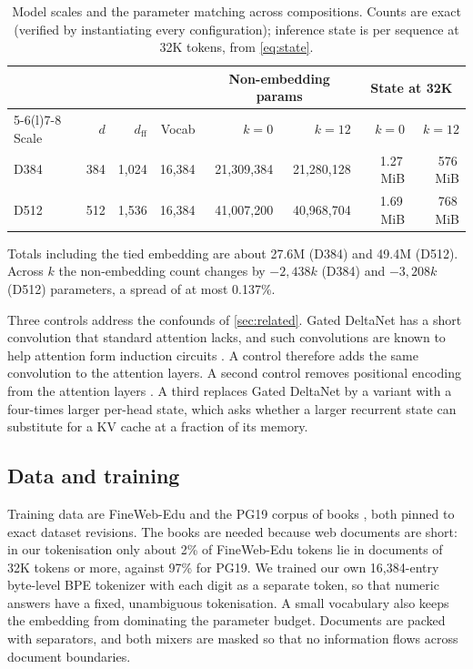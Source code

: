 \documentclass[10pt,a4paper]{article}
\begin{document}
\begin{table}[t]
\centering\tablefont
\caption{Model scales and the parameter matching across compositions. Counts are exact (verified by
instantiating every configuration); inference state is per sequence at 32K tokens, from
\cref{eq:state}.}
\label{tab:configs}
\begin{tabular}{@{}l r r r r r r r@{}}
\toprule
& & & & \multicolumn{2}{c}{Non-embedding params} & \multicolumn{2}{c}{State at 32K} \\
\cmidrule(lr){5-6}\cmidrule(l){7-8}
Scale & $d$ & $d_{\text{ff}}$ & Vocab & $k=0$ & $k=12$ & $k=0$ & $k=12$ \\
\midrule
D384 & 384 & 1{,}024 & 16{,}384 & 21{,}309{,}384 & 21{,}280{,}128 & 1.27\,MiB & 576\,MiB \\
D512 & 512 & 1{,}536 & 16{,}384 & 41{,}007{,}200 & 40{,}968{,}704 & 1.69\,MiB & 768\,MiB \\
\bottomrule
\end{tabular}
\par\smallskip
\begin{minipage}{0.97\textwidth}\footnotesize\color{ink2}
Totals including the tied embedding are about 27.6M (D384) and 49.4M (D512). Across $k$ the
non-embedding count changes by $-2{,}438k$ (D384) and $-3{,}208k$ (D512) parameters, a spread of at
most 0.137\%.
\end{minipage}
\end{table}

Three controls address the confounds of \cref{sec:related}. Gated DeltaNet has a short convolution
that standard attention lacks, and such convolutions are known to help attention form induction
circuits \citep{olsson2022induction}. A control therefore adds the same convolution to the attention
layers. A second control removes positional encoding from the attention layers
\citep{kazemnejad2023nope}. A third replaces Gated DeltaNet by a variant with a four-times larger
per-head state, which asks whether a larger recurrent state can substitute for a KV cache at a
fraction of its memory.

\subsection{Data and training}\label{sec:training}
Training data are FineWeb-Edu \citep{penedo2024fineweb} and the PG19 corpus of books
\citep{rae2020compressive}, both pinned to exact dataset revisions. The books are needed because
web documents are short: in our tokenisation only about 2\% of FineWeb-Edu tokens lie in documents of
32K tokens or more, against 97\% for PG19. We trained our own 16,384-entry byte-level BPE tokenizer
with each digit as a separate token, so that numeric answers have a fixed, unambiguous tokenisation.
A small vocabulary also keeps the embedding from dominating the parameter budget. Documents are
packed with separators, and both mixers are masked so that no information flows across document
boundaries.
\end{document}
